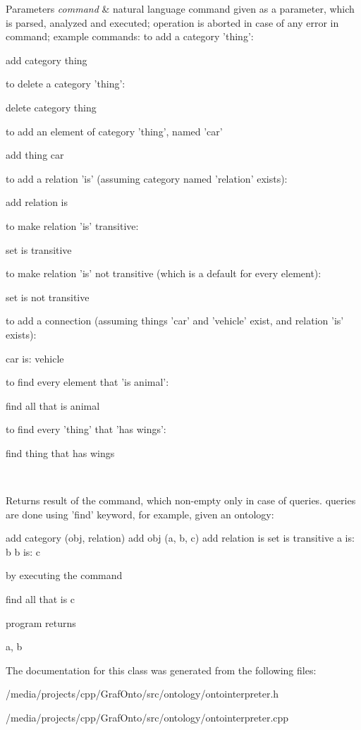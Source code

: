 \begin{DoxyParams}{\-Parameters}
{\em command} & natural language command given as a parameter, which is parsed, analyzed and executed; operation is aborted in case of any error in command; example commands\-: to add a category 'thing'\-: 
\begin{DoxyCode}
 add category thing 
\end{DoxyCode}
 to delete a category 'thing'\-: 
\begin{DoxyCode}
 delete category thing 
\end{DoxyCode}
 to add an element of category 'thing', named 'car' 
\begin{DoxyCode}
 add thing car 
\end{DoxyCode}
 to add a relation 'is' (assuming category named 'relation' exists)\-: 
\begin{DoxyCode}
 add relation is 
\end{DoxyCode}
 to make relation 'is' transitive\-: 
\begin{DoxyCode}
 set is transitive 
\end{DoxyCode}
 to make relation 'is' not transitive (which is a default for every element)\-: 
\begin{DoxyCode}
 set is not transitive 
\end{DoxyCode}
 to add a connection (assuming things 'car' and 'vehicle' exist, and relation 'is' exists)\-: 
\begin{DoxyCode}
 car is: vehicle 
\end{DoxyCode}
 to find every element that 'is animal'\-: 
\begin{DoxyCode}
 find all that is animal 
\end{DoxyCode}
 to find every 'thing' that 'has wings'\-: 
\begin{DoxyCode}
 find thing that has wings 
\end{DoxyCode}
 \\
\hline
\end{DoxyParams}
\begin{DoxyReturn}{\-Returns}
result of the command, which non-\/empty only in case of queries. queries are done using 'find' keyword, for example, given an ontology\-: 
\begin{DoxyCode}
 add category (obj, relation)
      add obj (a, b, c)
      add relation is
      set is transitive
      a is: b
      b is: c
\end{DoxyCode}
 by executing the command 
\begin{DoxyCode}
 find all that is c 
\end{DoxyCode}
 program returns 
\begin{DoxyCode}
 a, b 
\end{DoxyCode}
 
\end{DoxyReturn}


\-The documentation for this class was generated from the following files\-:\begin{DoxyCompactItemize}
\item 
/media/projects/cpp/\-Graf\-Onto/src/ontology/ontointerpreter.\-h\item 
/media/projects/cpp/\-Graf\-Onto/src/ontology/ontointerpreter.\-cpp\end{DoxyCompactItemize}
